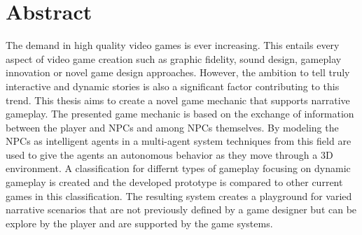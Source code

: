 \chapter{Abstract}\label{Abstract}
The demand in high quality video games is ever increasing. This entails every aspect of video game creation such as graphic fidelity, sound design, gameplay innovation or novel game design approaches. However, the ambition to tell truly interactive and dynamic stories is also a significant factor contributing to this trend. This thesis aims to create a novel game mechanic that supports narrative gameplay. The presented game mechanic is based on the exchange of information between the player and NPCs and among NPCs themselves. By modeling the NPCs as intelligent agents in a multi-agent system techniques from this field are used to give the agents an autonomous behavior as they move through a 3D environment. A classification for differnt types of gameplay focusing on dynamic gameplay is created and the developed prototype is compared to other current games in this classification. The resulting system creates a playground for varied narrative scenarios that are not previously defined by a game designer but can be explore by the player and are supported by the game systems.